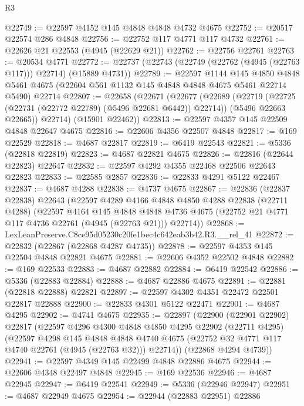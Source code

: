 \begin{lexlean}{R3}
\begin{coremodule}
@22749 := @22597 @4152 @145 @4848 @4848 @4732 @4675
@22752 := @20517 @22574 @286 @4848
@22756 := @22752 @117 @4771 @117 @4732
@22761 := @22626 @21 @22553 (@4945 (@22629 @21))
@22762 := @22756 @22761
@22763 := @20534 @4771
@22772 := @22737 (@22743 (@22749 (@22762 (@4945 (@22763 @117))) @22714) (@15889 @4731))
@22789 := @22597
    @1144
    @145
    @4850
    @4848
    @5461
    @4675
    (@22604 @561 @1132 @145 @4848 @4848 @4675 @5461 @22714 @5490)
    @22714
@22807 := @22658
    (@22671
      (@22677
        (@22689
          (@22719 (@22725 (@22731 (@22772 @22789) (@5496 @22681 @6442)) @22714))
          (@5496 @22663 @22665))
        @22714)
      (@15901 @22462))
@22813 := @22597 @4357 @145 @22509 @4848 @22647 @4675
@22816 := @22606 @4356 @22507 @4848
@22817 := @169 @22529
@22818 := @4687 @22817
@22819 := @6419 @22543
@22821 := @5336 (@22818 @22819)
@22823 := @4687 @22821 @4675
@22826 := @22816 (@22644 @22823) @22647
@22832 := @22597 @4292 @4355 @22468 @22506 @22643 @22823
@22833 := @22585 @2857
@22836 := @22833 @4291 @5122 @22467
@22837 := @4687 @4288
@22838 := @4737 @4675
@22867 := @22836
    (@22837 @22838)
    @22643
    (@22597
      @4289
      @4166
      @4848
      @4850
      @4288
      @22838
      (@22711 @4288)
      (@22597
        @4164
        @145
        @4848
        @4848
        @4736
        @4675
        (@22752 @21 @4771 @117 @4736 @22761 (@4945 (@22763 @21)))
        @22714))
@22868 := LexLeanPreserve.C8ce95d05230c20fe1bec4c642eab3b42.R3.__rel_41
@22872 := @22832 (@22867 (@22868 @4287 @4735))
@22878 := @22597 @4353 @145 @22504 @4848 @22821 @4675
@22881 := @22606 @4352 @22502 @4848
@22882 := @169 @22533
@22883 := @4687 @22882
@22884 := @6419 @22542
@22886 := @5336 (@22883 @22884)
@22888 := @4687 @22886 @4675
@22891 := @22881 (@22818 @22888) @22821
@22897 := @22597 @4302 @4351 @22472 @22501 @22817 @22888
@22900 := @22833 @4301 @5122 @22471
@22901 := @4687 @4295
@22902 := @4741 @4675
@22935 := @22897
    (@22900
      (@22901 @22902)
      @22817
      (@22597
        @4296
        @4300
        @4848
        @4850
        @4295
        @22902
        (@22711 @4295)
        (@22597
          @4298
          @145
          @4848
          @4848
          @4740
          @4675
          (@22752 @32 @4771 @117 @4740 @22761 (@4945 (@22763 @32)))
          @22714))
      (@22868 @4294 @4739))
@22941 := @22597 @4349 @145 @22499 @4848 @22886 @4675
@22944 := @22606 @4348 @22497 @4848
@22945 := @169 @22536
@22946 := @4687 @22945
@22947 := @6419 @22541
@22949 := @5336 (@22946 @22947)
@22951 := @4687 @22949 @4675
@22954 := @22944 (@22883 @22951) @22886

\end{coremodule}
\end{lexlean}
